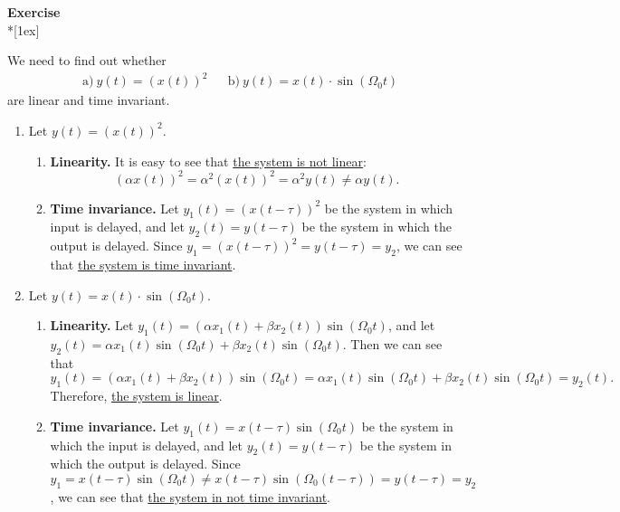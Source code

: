 \documentclass[12pt,a4paper,austrian]{article}
\newcounter{theaufgabe}\setcounter{theaufgabe}{1}
\newenvironment{aufgabe}[1]%
  {\bigskip\par\noindent\begin{nopagebreak}
   \textsf{\textbf{Exercise \arabic{theaufgabe}}}\quad
      \textsf{\textit{#1}}\\*[1ex]%
\stepcounter{theaufgabe}\hspace{2ex}\end{nopagebreak}}
  {\par\pagebreak[2]}
\begin{document}
\begin{aufgabe}{} %
  We need to find out whether
  \begin{align*}
    &\text{a)} \ y(t) = \left( x(t) \right)^2
    &&\text{b)} \ y(t) = x(t) \cdot \sin{(\Omega_0 t)}
  \end{align*}
  are linear and time invariant.

  \begin{enumerate}
    \item Let $y(t) = \left( x(t) \right)^2$.
    \begin{enumerate}

      \item \textbf{Linearity.} It is easy to see that \underline{the system is not linear}:
      $$
      \left( \alpha x(t) \right)^2
      = \alpha^2 \left( x(t) \right)^2
      = \alpha^2 y(t)
      \neq \alpha y(t).
      $$

      \item \textbf{Time invariance.} Let $y_1(t) = \left( x(t-\tau) \right)^2$ be the system in which input is delayed, and let $y_2(t) = y(t-\tau)$ be the system in which the output is delayed. Since $y_1 = \left( x(t-\tau) \right)^2 = y(t-\tau) = y_2$, we can see that \underline{the system is time invariant}.

    \end{enumerate}

    \item Let $y(t) = x(t) \cdot \sin{(\Omega_0 t)}$.
    \begin{enumerate}

      \item \textbf{Linearity.} Let $y_1(t) = \left(\alpha x_1(t) + \beta x_2(t)\right) \sin{(\Omega_0 t)}$, and let $y_2(t) = \alpha x_1(t) \sin{(\Omega_0 t)} + \beta x_2(t) \sin{(\Omega_0 t)}$. Then we can see that
      $$
      y_1(t) = \left(\alpha x_1(t) + \beta x_2(t)\right) \sin{(\Omega_0 t)} = \alpha x_1(t) \sin{(\Omega_0 t)} + \beta x_2(t) \sin{(\Omega_0 t)} = y_2(t).
      $$
      Therefore, \underline{the system is linear}.

      \item \textbf{Time invariance.} Let $y_1(t) = x(t-\tau) \sin{(\Omega_0 t)}$ be the system in which the input is delayed, and let $y_2(t) = y(t-\tau)$ be the system in which the output is delayed. Since $y_1 = x(t-\tau) \sin{(\Omega_0 t)} \neq x(t-\tau) \sin{(\Omega_0 (t-\tau))} = y(t-\tau) = y_2$, we can see that \underline{the system in not time invariant}.
    \end{enumerate}
  \end{enumerate}

\end{aufgabe}
\end{document}
